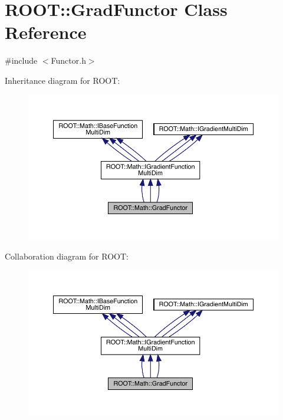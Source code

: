 \hypertarget{classROOT_1_1Math_1_1GradFunctor}{}\section{R\+O\+OT\+:\+:Grad\+Functor Class Reference}
\label{classROOT_1_1Math_1_1GradFunctor}


{\ttfamily \#include $<$Functor.\+h$>$}



Inheritance diagram for R\+O\+OT\+:
\nopagebreak
\begin{figure}[H]
\begin{center}
\leavevmode
\includegraphics[width=350pt]{de/d4b/classROOT_1_1Math_1_1GradFunctor__inherit__graph}
\end{center}
\end{figure}


Collaboration diagram for R\+O\+OT\+:
\nopagebreak
\begin{figure}[H]
\begin{center}
\leavevmode
\includegraphics[width=350pt]{da/d5d/classROOT_1_1Math_1_1GradFunctor__coll__graph}
\end{center}
\end{figure}
